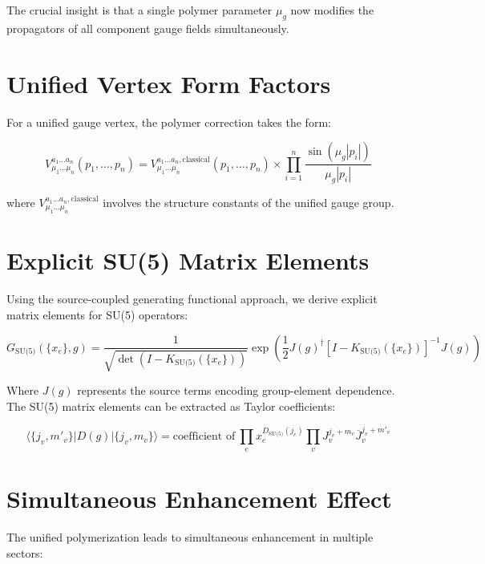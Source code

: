 \documentclass[11pt]{article}
\begin{document}
The crucial insight is that a single polymer parameter $\mu_g$ now modifies the propagators of all component gauge fields simultaneously.

\section{Unified Vertex Form Factors}

For a unified gauge vertex, the polymer correction takes the form:

\begin{equation}
  \boxed{
  V^{a_1\ldots a_n}_{\mu_1\ldots\mu_n}(p_1,\ldots,p_n) = V^{a_1\ldots a_n,\text{classical}}_{\mu_1\ldots\mu_n}(p_1,\ldots,p_n) \times \prod_{i=1}^{n} \frac{\sin(\mu_g |p_i|)}{\mu_g |p_i|}
  }
\end{equation}

where $V^{a_1\ldots a_n,\text{classical}}_{\mu_1\ldots\mu_n}$ involves the structure constants of the unified gauge group.

\section{Explicit SU(5) Matrix Elements}

Using the source-coupled generating functional approach, we derive explicit matrix elements for SU(5) operators:

\begin{equation}
G_{\text{SU(5)}}(\{x_e\}, g) = 
\frac{1}{\sqrt{\det(I - K_{\text{SU(5)}}(\{x_e\}))}}
\exp\left(\frac{1}{2}J(g)^\dagger [I - K_{\text{SU(5)}}(\{x_e\})]^{-1} J(g)\right)
\end{equation}

Where $J(g)$ represents the source terms encoding group-element dependence. The SU(5) matrix elements can be extracted as Taylor coefficients:

\begin{equation}
\langle\{j_v, m'_v\}|D(g)|\{j_v, m_v\}\rangle = 
\text{coefficient of}\ \prod_e x_e^{D_{\text{SU(5)}}(j_e)}\prod_v J_v^{j_v+m_v}\overline{J}_v^{j_v+m'_v}
\end{equation}

\section{Simultaneous Enhancement Effect}

The unified polymerization leads to simultaneous enhancement in multiple sectors:
\end{document}
